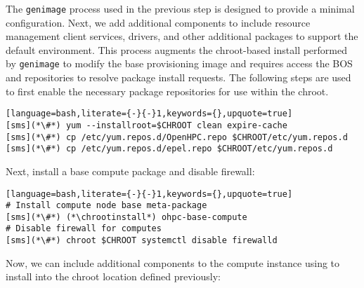 
The \texttt{genimage} process used in the previous step is designed to provide a minimal \baseOS{} configuration. Next,
we add additional components to include resource management client services, \InfiniBand{} drivers, and other additional
packages to support the default \OHPC{} environment. This process augments the chroot-based install performed by
\texttt{genimage} to modify the base provisioning image and requires access the BOS and \OHPC{} repositories to resolve
package install requests. The following steps are used to first enable the necessary package repositories for use within
the chroot.

\begin{lstlisting}[language=bash,literate={-}{-}1,keywords={},upquote=true]
[sms](*\#*) yum --installroot=$CHROOT clean expire-cache
[sms](*\#*) cp /etc/yum.repos.d/OpenHPC.repo $CHROOT/etc/yum.repos.d
[sms](*\#*) cp /etc/yum.repos.d/epel.repo $CHROOT/etc/yum.repos.d
\end{lstlisting}

\noindent Next, install a base compute package and disable firewall:
\begin{lstlisting}[language=bash,literate={-}{-}1,keywords={},upquote=true]
# Install compute node base meta-package
[sms](*\#*) (*\chrootinstall*) ohpc-base-compute
# Disable firewall for computes
[sms](*\#*) chroot $CHROOT systemctl disable firewalld
\end{lstlisting}

\noindent Now, we can include additional components to the compute instance using
\texttt{\pkgmgr{}} to install into the chroot location defined previously:
